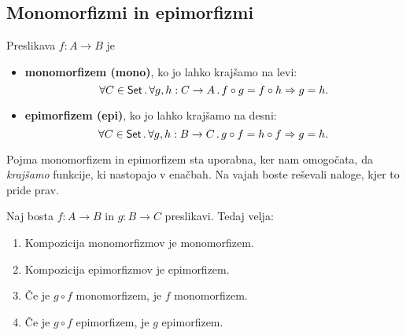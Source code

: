 \subsection{Monomorfizmi in epimorfizmi}

\begin{definicija}
  Preslikava $f : A \to B$ je
  \begin{itemize}
  \item \textbf{monomorfizem (mono)}, ko jo lahko krajšamo na levi:
    \begin{equation*}
      \forall C \in \mathsf{Set} \,.\, \forall g, h : C \to A \,.\, f \circ g = f \circ h \Rightarrow g = h.
    \end{equation*}

   \item \textbf{epimorfizem (epi)}, ko jo lahko krajšamo na desni:
     \begin{equation*}
      \forall C \in \mathsf{Set} \,.\, \forall g, h : B \to C \,.\, g \circ f = h \circ f \Rightarrow g = h.
    \end{equation*}
  \end{itemize}
\end{definicija}

Pojma monomorfizem in epimorfizem sta uporabna, ker nam omogočata, da \emph{krajšamo} funkcije, ki nastopajo v enačbah. Na vajah boste reševali naloge, kjer to pride prav.

\begin{izrek}
  \label{izr:epi-mono-comp}
  Naj bosta $f : A \to B$ in $g : B \to C$ preslikavi. Tedaj velja:
  \begin{enumerate}
  \item Kompozicija monomorfizmov je monomorfizem.
  \item Kompozicija epimorfizmov je epimorfizem.
  \item Če je $g \circ f$ monomorfizem, je $f$ monomorfizem.
  \item Če je $g \circ f$ epimorfizem, je $g$ epimorfizem.
  \end{enumerate}
\end{izrek}

